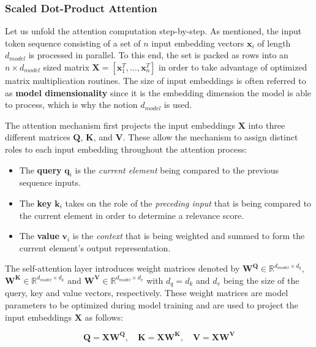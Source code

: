 \subsubsection{Scaled Dot-Product Attention}
Let us unfold the attention computation step-by-step. As mentioned, the input
token sequence consisting of a set of $n$ input embedding vectors $\bm{x}_i$ of
length $d_{model}$ is processed in parallel. To this end, the set is packed as
rows into an $n \times d_{model}$ sized matrix $\bm{X} = [\bm{x}_1^T, \ldots,
\bm{x}_n^T]$ in order to take advantage of optimized matrix multiplication
routines. The size of input embeddings is often referred to as \textbf{model
dimensionality} since it is the embedding dimension the model is able to
process, which is why the notion $d_{model}$ is used. 

The attention mechanism first projects the input embeddings $\bm{X}$ into three
different matrices $\bm{Q}$, $\bm{K}$, and $\bm{V}$. These allow the mechanism
to assign distinct roles to each input embedding throughout the attention
process:

\begin{itemize}
    \item The \textbf{query} $\bm{q}_i$ is the \textit{current element} being
    compared to the previous sequence inputs.
    \item The \textbf{key} $\bm{k}_i$ takes on the role of the \textit{preceding
    input} that is being compared to the current element in order to determine a
    relevance score.
    \item The \textbf{value} $\bm{v}_i$ is the \textit{context} that is being
    weighted and summed to form the current element's output representation.
\end{itemize}

The self-attention layer introduces weight matrices denoted by $\bm{W^Q} \in
\mathbb{R}^{d_{model} \times d_q}$, $\bm{W^K} \in \mathbb{R}^{d_{model} \times
d_k}$ and $\bm{W^V} \in \mathbb{R}^{d_{model} \times d_v}$ with $d_q = d_k$ and
$d_v$ being the size of the query, key and value vectors, respectively. These
weight matrices are model parameters to be optimized during model training and
are used to project the input embeddings $\bm{X}$ as follows:

\begin{equation}
    \label{eq:qkv_projection}
    \bm{Q} = \bm{X} \bm{W^Q}, \quad 
    \bm{K} = \bm{X} \bm{W^K}, \quad 
    \bm{V} = \bm{X} \bm{W^V}
\end{equation}

